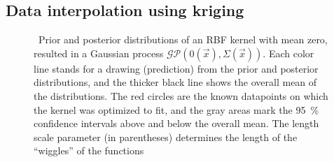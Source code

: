 \begin{description}
%	
\end{description}

\subsection{Data interpolation using kriging}
\label{subsec:interploating_data_using_kriging}
	
\begin{figure}[t]
	\centering
	\hfill %
	\caption[Prior and posterior of RBF kernel]
		{\hspace{-0.18cm}\footnotemark\ 
		Prior and posterior distributions of an RBF kernel with mean zero, resulted in a Gaussian process $\mathcal{GP}\left( 0 (\vec{x}), \Sigma(\vec{x}) \right)$.
		Each color line stands for a drawing (prediction) from the prior and posterior distributions, and the thicker black line shows the overall mean of the distributions.
		The red circles are the known datapoints on which the kernel was optimized to fit, and the gray areas mark the \SI{95}{\percent} confidence intervals above and below the overall mean.
		The length scale parameter (in parentheses) determines the length of the \enquote{wiggles} of the functions}
	\label{fig:RBF_prior_posterior}
\end{figure}

